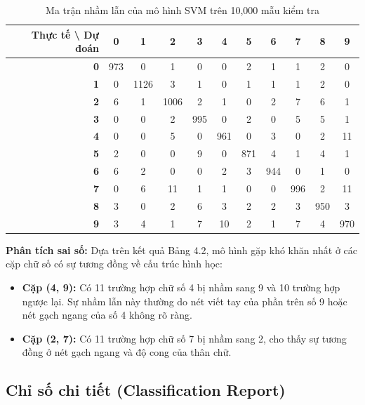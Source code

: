 \documentclass[../DoAn.tex]{subfiles}
\begin{document}
\begin{table}[H]
\centering
\small
\caption{Ma trận nhầm lẫn của mô hình SVM trên 10,000 mẫu kiểm tra}
\label{tab:svm_cm}
\begin{tabular}{r|cccccccccc}
\hline
\textbf{Thực tế \textbackslash{} Dự đoán} & \textbf{0} & \textbf{1} & \textbf{2} & \textbf{3} & \textbf{4} & \textbf{5} & \textbf{6} & \textbf{7} & \textbf{8} & \textbf{9} \\ \hline
\textbf{0} & 973 & 0   & 1   & 0   & 0   & 2   & 1   & 1   & 2   & 0   \\
\textbf{1} & 0   & 1126 & 3   & 1   & 0   & 1   & 1   & 1   & 2   & 0   \\
\textbf{2} & 6   & 1   & 1006 & 2   & 1   & 0   & 2   & 7   & 6   & 1   \\
\textbf{3} & 0   & 0   & 2   & 995 & 0   & 2   & 0   & 5   & 5   & 1   \\
\textbf{4} & 0   & 0   & 5   & 0   & 961 & 0   & 3   & 0   & 2   & 11  \\
\textbf{5} & 2   & 0   & 0   & 9   & 0   & 871 & 4   & 1   & 4   & 1   \\
\textbf{6} & 6   & 2   & 0   & 0   & 2   & 3   & 944 & 0   & 1   & 0   \\
\textbf{7} & 0   & 6   & 11  & 1   & 1   & 0   & 0   & 996 & 2   & 11  \\
\textbf{8} & 3   & 0   & 2   & 6   & 3   & 2   & 2   & 3   & 950 & 3   \\
\textbf{9} & 3   & 4   & 1   & 7   & 10  & 2   & 1   & 7   & 4   & 970 \\ \hline
\end{tabular}
\end{table}

\textbf{Phân tích sai số:} Dựa trên kết quả Bảng 4.2, mô hình gặp khó khăn nhất ở các cặp chữ số có sự tương đồng về cấu trúc hình học:
\begin{itemize}
    \item \textbf{Cặp (4, 9):} Có 11 trường hợp chữ số 4 bị nhầm sang 9 và 10 trường hợp ngược lại. Sự nhầm lẫn này thường do nét viết tay của phần trên số 9 hoặc nét gạch ngang của số 4 không rõ ràng.
    \item \textbf{Cặp (2, 7):} Có 11 trường hợp chữ số 7 bị nhầm sang 2, cho thấy sự tương đồng ở nét gạch ngang và độ cong của thân chữ.\\
\end{itemize}

\subsection{Chỉ số chi tiết (Classification Report)}
\end{document}
